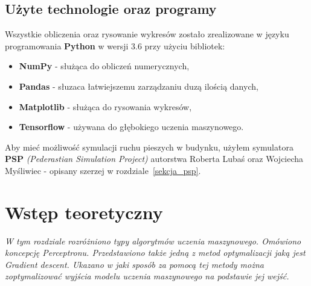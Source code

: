 \documentclass[12pt]{aghdpl}
\begin{document}
		\section{Użyte technologie oraz programy}
		Wszystkie obliczenia oraz rysowanie wykresów zostało zrealizowane w języku programowania \textbf{Python} w wersji 3.6 przy użyciu bibliotek:
		\begin{itemize}
			\item \textbf{NumPy} - służąca do obliczeń numerycznych,
			\item \textbf{Pandas} - słuzaca łatwiejszemu zarządzaniu duzą ilością danych,
			\item \textbf{Matplotlib} - służąca do rysowania wykresów,
			\item \textbf{Tensorflow} - używana do głębokiego uczenia maszynowego.
		\end{itemize}
		
		Aby mieć możliwość symulacji ruchu pieszych w budynku, użyłem symulatora \textbf{PSP} \textit{(Pederastian Simulation Project)} autorstwa Roberta Lubaś oraz Wojciecha Myśliwiec - opisany szerzej w rozdziale~\ref{sekcja_psp}.
		
	\chapter{Wstęp teoretyczny}
	\textit{W tym rozdziale rozróżniono typy algorytmów uczenia maszynowego. Omówiono koncepcję Perceptronu. Przedstawiono także jedną z metod optymalizacji jaką jest Gradient descent. Ukazano w jaki sposób za pomocą tej metody można zoptymalizować wyjścia modelu uczenia maszynowego na podstawie jej wejść.}
	
\end{document}
